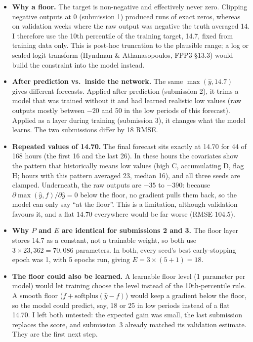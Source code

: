 \begin{itemize}
  \item \textbf{Why a floor.} The target is non-negative and effectively never zero. Clipping negative outputs at 0 (submission 1) produced runs of exact zeros, whereas on validation weeks where the raw output was negative the truth averaged 14. I therefore use the 10th percentile of the training target, 14.7, fixed from training data only. This is post-hoc truncation to the plausible range; a log or scaled-logit transform (Hyndman \& Athanasopoulos, FPP3 \S13.3) would build the constraint into the model instead.
  \item \textbf{After prediction vs.\ inside the network.} The same $\max(\hat y, 14.7)$ gives different forecasts. Applied after prediction (submission 2), it trims a model that was trained without it and had learned realistic low values (raw outputs mostly between $-20$ and 50 in the low periods of this forecast). Applied as a layer during training (submission 3), it changes what the model learns. The two submissions differ by 18 RMSE.
  \item \textbf{Repeated values of 14.70.} The final forecast sits exactly at 14.70 for 44 of 168 hours (the first 16 and the last 26). In these hours the covariates show the pattern that historically means low values (high C, accumulating D, flag H; hours with this pattern averaged 23, median 16), and all three seeds are clamped. Underneath, the raw outputs are $-35$ to $-390$: because $\partial \max(\hat y, f)/\partial \hat y = 0$ below the floor, no gradient pulls them back, so the model can only say ``at the floor''. This is a limitation, although validation favours it, and a flat 14.70 everywhere would be far worse (RMSE 104.5).
  \item \textbf{Why $P$ and $E$ are identical for submissions 2 and 3.} The floor layer stores 14.7 as a constant, not a trainable weight, so both use $3 \times 23{,}362 = 70{,}086$ parameters. In both, every seed's best early-stopping epoch was 1, with 5 epochs run, giving $E = 3 \times (5 + 1) = 18$.
  \item \textbf{The floor could also be learned.} A learnable floor level (1 parameter per model) would let training choose the level instead of the 10th-percentile rule. A smooth floor ($f + \mathrm{softplus}(\hat y - f)$) would keep a gradient below the floor, so the model could predict, say, 18 or 25 in low periods instead of a flat 14.70. I left both untested: the expected gain was small, the last submission replaces the score, and submission~3 already matched its validation estimate. They are the first next step.
\end{itemize}

